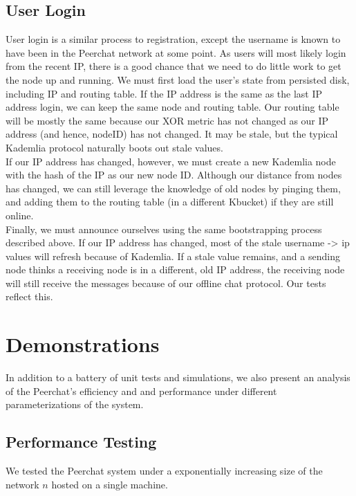 \documentclass{article}
\begin{document}
\subsection{User Login}

User login is a similar process to registration, except the username is known to have been in the Peerchat network at some point. As users will most likely login from the recent IP, there is a good chance that we need to do little work to get the node up and running. We must first load the user's state from persisted disk, including IP and routing table. If the IP address is the same as the last IP address login, we can keep the same node and routing table. Our routing table will be mostly the same because our XOR metric has not changed as our IP address (and hence, nodeID) has not changed. It may be stale, but the typical Kademlia protocol naturally boots out stale values. \\

If our IP address has changed, however, we must create a new Kademlia node with the hash of the IP as our new node ID. Although our distance from nodes has changed, we can still leverage the knowledge of old nodes by pinging them, and adding them to the routing table (in a different Kbucket)  if they are still online. \\

Finally, we must announce ourselves using the same bootstrapping process described above. If our IP address has changed, most of the stale username -> ip values will refresh because of Kademlia. If a stale value remains, and a sending node thinks a receiving node is in a different, old IP address, the receiving node will still receive the messages because of our offline chat protocol. Our tests reflect this. 

\section{Demonstrations}

In addition to a battery of unit tests and simulations, we also present an analysis of the Peerchat's efficiency and and performance under different parameterizations of the system. 

\subsection{Performance Testing}

We tested the Peerchat system under a exponentially increasing size of the network $n$ hosted on a single machine. \\
\end{document}
